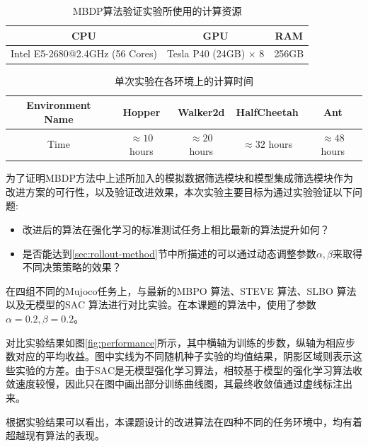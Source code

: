 \begin{table}[ht]
\centering
\begin{tabular}{c|c|c}
\toprule[2pt]
CPU                      & GPU                         & RAM   \\
\midrule[1pt]
Intel E5-2680@2.4GHz (56 Cores) & Tesla P40 (24GB) $\times$ 8 & 256GB\\
\bottomrule[2pt]
\end{tabular}
\caption{MBDP算法验证实验所使用的计算资源}
\label{tab:computing-resources}
\end{table}

\begin{table}
\centering
\begin{tabular}{c|c|c|c|c}
\toprule
Environment Name  & Hopper      & Walker2d    & HalfCheetah & Ant         \\
\midrule
Time & $\approx 10$ hours & $\approx 20$ hours & $\approx 32$ hours & $\approx 48$ hours \\
\bottomrule
\end{tabular}
\caption{单次实验在各环境上的计算时间}
\label{tab:run-time}
\end{table}

为了证明MBDP方法中上述所加入的模拟数据筛选模块和模型集成筛选模块作为改进方案的可行性，以及验证改进效果，本次实验主要目标为通过实验验证以下问题:

\begin{itemize}
    \item 改进后的算法在强化学习的标准测试任务上相比最新的算法提升如何？
    \item 是否能达到\ref{sec:rollout-method}节中所描述的可以通过动态调整参数$\alpha,\beta$来取得不同决策策略的效果？
\end{itemize}

在四组不同的Mujoco任务上，与最新的MBPO \cite{janner2019trust}算法、STEVE \cite{buckman2018sample}算法、SLBO \cite{Luo2019AlgorithmicGuarantees}算法以及无模型的SAC \cite{haarnoja2018soft}算法进行对比实验。在本课题的算法中，使用了参数$\alpha=0.2, \beta=0.2$。

对比实验结果如图\ref{fig:performance}所示，其中横轴为训练的步数，纵轴为相应步数对应的平均收益。图中实线为不同随机种子实验的均值结果，阴影区域则表示这些实验的方差。由于SAC是无模型强化学习算法，相较基于模型的强化学习算法收敛速度较慢，因此只在图中画出部分训练曲线图，其最终收敛值通过虚线标注出来。

根据实验结果可以看出，本课题设计的改进算法在四种不同的任务环境中，均有着超越现有算法的表现。

